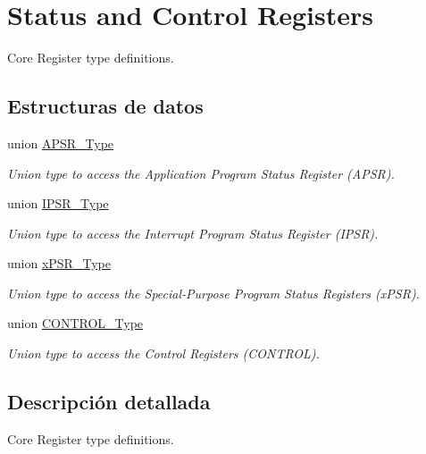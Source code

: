 \hypertarget{group___c_m_s_i_s___c_o_r_e}{}\section{Status and Control Registers}
\label{group___c_m_s_i_s___c_o_r_e}


Core Register type definitions.  


\subsection*{Estructuras de datos}
\begin{DoxyCompactItemize}
\item 
union \mbox{\hyperlink{union_a_p_s_r___type}{A\+P\+S\+R\+\_\+\+Type}}
\begin{DoxyCompactList}\small\item\em Union type to access the Application Program Status Register (A\+P\+SR). \end{DoxyCompactList}\item 
union \mbox{\hyperlink{union_i_p_s_r___type}{I\+P\+S\+R\+\_\+\+Type}}
\begin{DoxyCompactList}\small\item\em Union type to access the Interrupt Program Status Register (I\+P\+SR). \end{DoxyCompactList}\item 
union \mbox{\hyperlink{unionx_p_s_r___type}{x\+P\+S\+R\+\_\+\+Type}}
\begin{DoxyCompactList}\small\item\em Union type to access the Special-\/\+Purpose Program Status Registers (x\+P\+SR). \end{DoxyCompactList}\item 
union \mbox{\hyperlink{union_c_o_n_t_r_o_l___type}{C\+O\+N\+T\+R\+O\+L\+\_\+\+Type}}
\begin{DoxyCompactList}\small\item\em Union type to access the Control Registers (C\+O\+N\+T\+R\+OL). \end{DoxyCompactList}\end{DoxyCompactItemize}


\subsection{Descripción detallada}
Core Register type definitions. 

